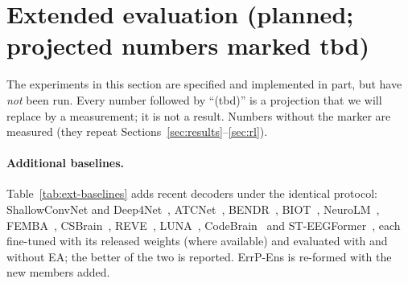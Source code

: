\ifnum{}
\section{Extended evaluation (planned; projected numbers marked tbd)}
\label{sec:extended}

The experiments in this section are specified and implemented in part, but have \emph{not} been run. Every
number followed by ``(tbd)'' is a projection that we will replace by a measurement; it is not a result.
Numbers without the marker are measured (they repeat Sections~\ref{sec:results}--\ref{sec:rl}).

\paragraph{Additional baselines.} Table~\ref{tab:ext-baselines} adds recent decoders under the identical
protocol: ShallowConvNet and Deep4Net~\citep{schirrmeister2017deep}, ATCNet~\citep{altaheri2023physics},
BENDR~\citep{kostas2021bendr}, BIOT~\citep{yang2023biot}, NeuroLM~\citep{jiang2025neurolm},
FEMBA~\citep{tegon2025femba}, CSBrain~\citep{zhou2025csbrain}, REVE~\citep{elouahidi2025reve},
LUNA~\citep{doner2025luna}, CodeBrain~\citep{ma2026codebrain} and ST-EEGFormer~\citep{yang2026are}, each
fine-tuned with its released weights (where available) and evaluated with and without EA; the better of the two
is reported. ErrP-Ens is re-formed with the new members added.

